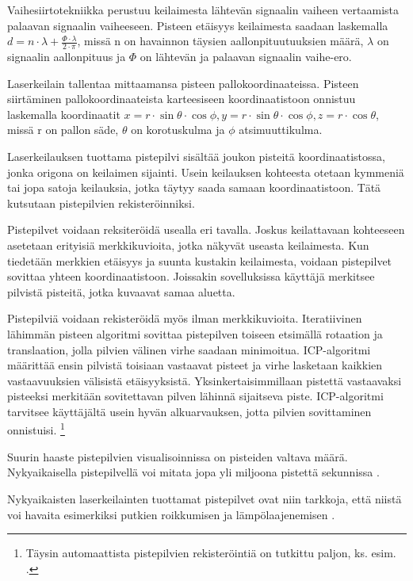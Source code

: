 Vaihesiirtotekniikka perustuu keilaimesta lähtevän signaalin vaiheen vertaamista palaavan signaalin vaiheeseen. Pisteen etäisyys keilaimesta saadaan laskemalla $d=n\cdot \lambda + \frac{\Phi \cdot \lambda}{2 \cdot \pi}$, missä n on havainnon täysien aallonpituutuuksien määrä, $\lambda$ on signaalin aallonpituus ja $\Phi$ on lähtevän ja palaavan signaalin vaihe-ero. \cite{fabritius}


Laserkeilain tallentaa mittaamansa pisteen pallokoordinaateissa. Pisteen siirtäminen pallokoordinaateista karteesiseen koordinaatistoon onnistuu laskemalla koordinaatit $x=r \cdot \sin \theta \cdot \cos \phi, y=r \cdot \sin \theta \cdot \cos \phi, z=r \cdot \cos \theta$, missä r on pallon säde, $\theta$ on korotuskulma ja $\phi$ atsimuuttikulma.   

Laserkeilauksen tuottama pistepilvi sisältää joukon pisteitä koordinaatistossa, jonka origona on keilaimen sijainti. Usein keilauksen kohteesta otetaan kymmeniä tai jopa satoja keilauksia, jotka täytyy saada samaan koordinaatistoon. Tätä kutsutaan pistepilvien rekisteröinniksi. 

Pistepilvet voidaan reksiteröidä usealla eri tavalla. Joskus keilattavaan kohteeseen asetetaan erityisiä merkkikuvioita, jotka näkyvät useasta keilaimesta. Kun tiedetään merkkien etäisyys ja suunta kustakin keilaimesta, voidaan pistepilvet sovittaa yhteen koordinaatistoon. Joissakin sovelluksissa käyttäjä merkitsee pilvistä pisteitä, jotka kuvaavat samaa aluetta.

Pistepilviä voidaan rekisteröidä myös ilman merkkikuvioita. Iteratiivinen lähimmän pisteen algoritmi  sovittaa pistepilven toiseen etsimällä rotaation ja translaation,
 jolla pilvien välinen virhe saadaan minimoitua. ICP-algoritmi määrittää ensin pilvistä toisiaan vastaavat pisteet ja virhe lasketaan kaikkien vastaavuuksien välisistä etäisyyksistä.
 Yksinkertaisimmillaan pistettä vastaavaksi pisteeksi merkitään sovitettavan pilven lähinnä sijaitseva piste. 
 ICP-algoritmi tarvitsee käyttäjältä usein hyvän alkuarvauksen, jotta pilvien sovittaminen onnistuisi. 
 \footnote{Täysin automaattista pistepilvien rekisteröintiä on tutkittu paljon, ks. esim. \cite{Pascal}.}



Suurin haaste pistepilvien visualisoinnissa on pisteiden valtava määrä. Nykyaikaisella pistepilvellä voi mitata jopa yli miljoona pistettä sekunnissa \cite{Elseberg}.

Nykyaikaisten laserkeilainten tuottamat pistepilvet ovat niin tarkkoja, että niistä voi havaita esimerkiksi putkien roikkumisen ja lämpölaajenemisen \cite{Piipponen}. 


